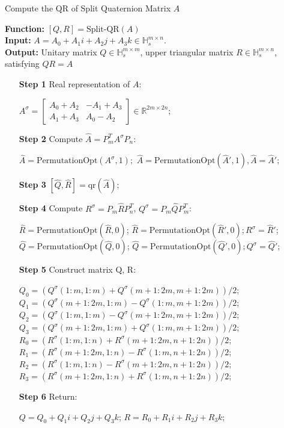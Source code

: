 \documentclass[1p]{elsarticle}
\numberwithin{equation}{section}
\begin{document}
\begin{algorithm}[htbp] 
    \caption{Compute the QR of Split Quaternion Matrix \(A\)}
    \label{alg:QR}
    \textbf{Function:} $[Q, R]=\text{Split-QR}(A)$\\
    \textbf{Input:} \(A = A_0 + A_1 i + A_2 j + A_3 k \in \mathbb{H}_s^{m\times n}\). \\
    {\textbf{Output:}  }  Unitary matrix \(Q \in \mathbb{H}_s^{m\times m}\), upper triangular matrix \(R \in \mathbb{H}_s^{m\times n}\), satisfying \(Q  R = A\) 
\begin{itemize}
    \item[\textbf{Step 1}] Real representation of $A$:
\begin{algorithmic}
    \State \(A^\sigma = \begin{bmatrix}
        A_0 + A_2 & -A_1 + A_3 \\ 
        A_1 + A_3 & A_0 - A_2
        \end{bmatrix} \in \mathbb{R}^{2m\times 2n}\);
\end{algorithmic}
     \item[\textbf{Step 2}] Compute \(\widehat{A} = P_{m}^T A^\sigma P_{n}\): 
\begin{algorithmic}
     \State $\widehat{A}=\text{PermutationOpt}(A^\sigma,1);$ 
     \State $\widehat{A}=\text{PermutationOpt}(\widehat{A}',1),\widehat{A}=\widehat{A}';$
\end{algorithmic}
    \item[\textbf{Step 3}] \([\widehat{Q},\widehat{R}] = \text{qr}(\widehat{A})\);
    \item[\textbf{Step 4}] Compute \(R^\sigma = P_{m}\widehat{R}P_{n}^T\), \(Q^\sigma = P_{m}\widehat{Q}P_{m}^T\): 
\begin{algorithmic}
    \State $\widehat{R}=\text{PermutationOpt}(\widehat{R},0)$;
    \State $\widehat{R}=\text{PermutationOpt}(\widehat{R}',0);R^\sigma=\widehat{R}'$;
    \State $\widehat{Q}=\text{PermutationOpt}(\widehat{Q},0)$;
    \State $\widehat{Q}=\text{PermutationOpt}(\widehat{Q}',0);Q^\sigma=\widehat{Q}'$;
\end{algorithmic}
    \item[\textbf{Step 5}] Construct matrix Q, R:
\begin{algorithmic}
        \State $Q_0 = (Q^\sigma(1\!:\!m,1\!:\!m) + Q^\sigma(m+1\!:\!2m,m+1\!:\!2m))/2$;
        \State $Q_1 = (Q^\sigma(m+1\!:\!2m,1\!:\!m) - Q^\sigma(1\!:\!m,m+1\!:\!2m))/2$;
        \State $Q_2 = (Q^\sigma(1\!:\!m,1\!:\!m) - Q^\sigma(m+1\!:\!2m,m+1\!:\!2m))/2$;
        \State $Q_3 = (Q^\sigma(m+1\!:\!2m,1\!:\!m) + Q^\sigma(1\!:\!m,m+1\!:\!2m))/2$;
        \State $R_0 = (R^\sigma(1\!:\!m,1\!:\!n) + R^\sigma(m+1\!:\!2m,n+1\!:\!2n))/2$;
        \State $R_1 = (R^\sigma(m+1\!:\!2m,1\!:\!n) - R^\sigma(1\!:\!m,n+1\!:\!2n))/2$;
        \State $R_2 = (R^\sigma(1\!:\!m,1\!:\!n) - R^\sigma(m+1\!:\!2m,n+1\!:\!2n))/2$;
        \State $R_3 = (R^\sigma(m+1\!:\!2m,1\!:\!n) + R^\sigma(1\!:\!m,n+1\!:\!2n))/2$;
\end{algorithmic}
    \item[\textbf{Step 6}] Return: 
\begin{algorithmic}
        \State $Q = Q_0 + Q_1i + Q_2j + Q_3k$;
        \State $R = R_0 + R_1i + R_2j + R_3k$;


\end{algorithmic}
\end{itemize}
\end{algorithm}
\end{document}
